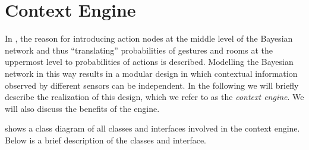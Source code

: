 \section{Context Engine}
\label{sec:implementation:context-engine}

In , the reason for introducing action nodes at the middle level of the Bayesian network and thus ``translating'' probabilities of gestures and rooms at the uppermost level to probabilities of actions is described. Modelling the Bayesian network in this way results in a modular design in which contextual information observed by different sensors can be independent. In the following we will briefly describe the realization of this design, which we refer to as the \emph{context engine}. We will also discuss the benefits of the engine.

 shows a class diagram of all classes and interfaces involved in the context engine. Below is a brief description of the classes and interface.

